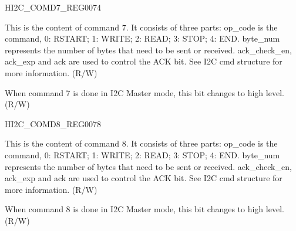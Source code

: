 \begin{register}{H}{I2C\_COMD7\_REG}{\hexprefix{}0074}\label{regdesc:I2CCOMD7REG}
%
%
%
\regnewline%
\begin{regdesc}\begin{reglist}
\label{fielddesc:I2CCOMMAND7}\item [I2C\_COMMAND7] This is the content of command 7. It consists of three parts:
op\_code is the command, 0: RSTART; 1: WRITE; 2: READ; 3: STOP; 4: END.
byte\_num represents the number of bytes that need to be sent or received.
ack\_check\_en, ack\_exp and ack are used to control the ACK bit. See I2C cmd structure for more information. (R/W)
\label{fielddesc:I2CCOMMAND7DONE}\item [I2C\_COMMAND7\_DONE] When command 7 is done in I2C Master mode, this bit changes to high level. (R/W)
\end{reglist}\end{regdesc}
\end{register}


\begin{register}{H}{I2C\_COMD8\_REG}{\hexprefix{}0078}\label{regdesc:I2CCOMD8REG}
%
%
%
\regnewline%
\begin{regdesc}\begin{reglist}
\label{fielddesc:I2CCOMMAND8}\item [I2C\_COMMAND8] This is the content of command 8. It consists of three parts:
op\_code is the command, 0: RSTART; 1: WRITE; 2: READ; 3: STOP; 4: END.
byte\_num represents the number of bytes that need to be sent or received.
ack\_check\_en, ack\_exp and ack are used to control the ACK bit. See I2C cmd structure for more information. (R/W)
\label{fielddesc:I2CCOMMAND8DONE}\item [I2C\_COMMAND8\_DONE] When command 8 is done in I2C Master mode, this bit changes to high level. (R/W)
\end{reglist}\end{regdesc}
\end{register}


